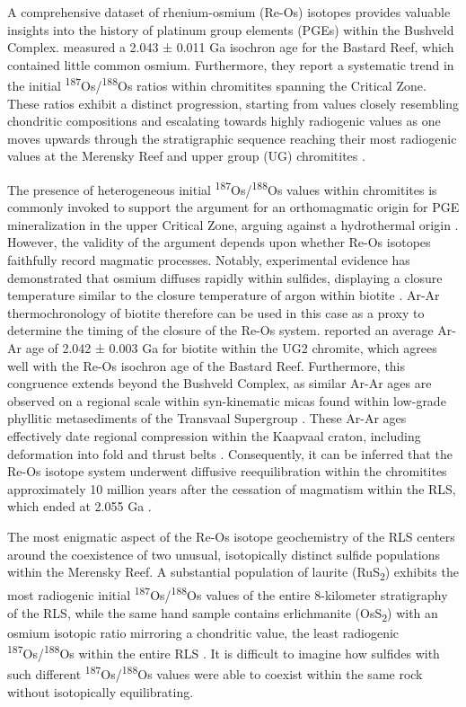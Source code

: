 A comprehensive dataset of rhenium-osmium (Re-Os) isotopes provides
valuable insights into the history of platinum group elements (PGEs)
within the Bushveld Complex. \citet{schoenberg1999} measured a 2.043 ±
0.011 Ga isochron age for the Bastard Reef, which contained little
common osmium. Furthermore, they report a systematic trend in the
initial \textsuperscript{187}Os/\textsuperscript{188}Os ratios within
chromitites spanning the Critical Zone. These ratios exhibit a distinct
progression, starting from values closely resembling chondritic
compositions and escalating towards highly radiogenic values as one
moves upwards through the stratigraphic sequence reaching their most
radiogenic values at the Merensky Reef and upper group (UG) chromitites
\citep{schoenberg1999,mccandless1999}.

The presence of heterogeneous initial
\textsuperscript{187}Os/\textsuperscript{188}Os values within
chromitites is commonly invoked to support the argument for an
orthomagmatic origin for PGE mineralization in the upper Critical Zone,
arguing against a hydrothermal origin \citep{schoenberg1999,mccandless1999}. However, the validity of the argument depends
upon whether Re-Os isotopes faithfully record magmatic processes.
Notably, experimental evidence has demonstrated that osmium diffuses
rapidly within sulfides, displaying a closure temperature similar to the
closure temperature of argon within biotite \citep{brenan2000}. Ar-Ar
thermochronology of biotite therefore can be used in this case as a
proxy to determine the timing of the closure of the Re-Os system. \citet{nomade2004}
reported an average Ar-Ar age of 2.042 ± 0.003 Ga for
biotite within the UG2 chromite, which agrees well with the Re-Os
isochron age of the Bastard Reef. Furthermore, this congruence extends
beyond the Bushveld Complex, as similar Ar-Ar ages are observed on a
regional scale within syn-kinematic micas found within low-grade
phyllitic metasediments of the Transvaal Supergroup \citep{alexandre2006}. These Ar-Ar ages effectively date regional compression within the
Kaapvaal craton, including deformation into fold and thrust belts
\citep{alexandre2006}. Consequently, it can be inferred that the
Re-Os isotope system underwent diffusive reequilibration within the
chromitites approximately 10 million years after the cessation of
magmatism within the RLS, which ended at 2.055 Ga \citep[age derived from][]{scoates2021,zeh2015}.

The most enigmatic aspect of the Re-Os isotope geochemistry of the RLS
centers around the coexistence of two unusual, isotopically distinct
sulfide populations within the Merensky Reef. A substantial population
of laurite (RuS\textsubscript{2}) exhibits the most radiogenic initial
\textsuperscript{187}Os/\textsuperscript{188}Os values of the entire 8-kilometer
stratigraphy of the RLS, while the same hand sample contains
erlichmanite (OsS\textsubscript{2}) with an osmium isotopic ratio
mirroring a chondritic value, the least radiogenic
\textsuperscript{187}Os/\textsuperscript{188}Os within the entire RLS
\citep{hart1989}. It is difficult to imagine how sulfides with
such different \textsuperscript{187}Os/\textsuperscript{188}Os values
were able to coexist within the same rock without isotopically
equilibrating.


